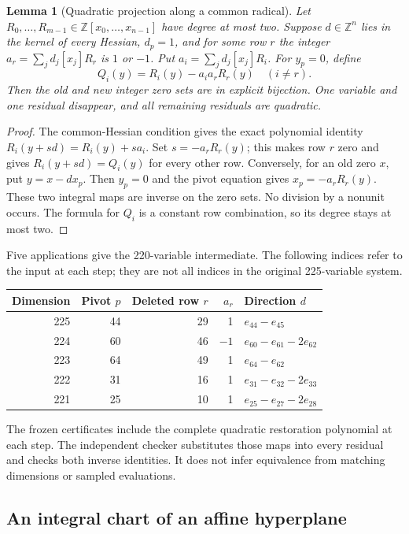 \documentclass[11pt,letterpaper]{article}
\newtheorem{lemma}[theorem]{Lemma}
\theoremstyle{definition}\newtheorem{definition}[theorem]{Definition}
\theoremstyle{remark}\newtheorem{remark}[theorem]{Remark}
\newcommand{\Z}{\mathbb Z}\newcommand{\N}{\mathbb N}
\begin{document}
\begin{lemma}[Quadratic projection along a common radical]\label{lem:radical}
Let $R_0,\ldots,R_{m-1}\in\Z[x_0,\ldots,x_{n-1}]$ have degree at most
two. Suppose $d\in\Z^n$ lies in the kernel of every Hessian, $d_p=1$,
and for some row $r$ the integer
$a_r=\sum_jd_j[x_j]R_r$ is $1$ or $-1$. Put $a_i=\sum_jd_j[x_j]R_i$.
For $y_p=0$, define
\[
 Q_i(y)=R_i(y)-a_i a_rR_r(y)\quad(i\ne r).
\]
Then the old and new integer zero sets are in explicit bijection. One
variable and one residual disappear, and all remaining residuals are
quadratic.
\end{lemma}
\begin{proof}
The common-Hessian condition gives the exact polynomial identity
$R_i(y+sd)=R_i(y)+sa_i$. Set $s=-a_rR_r(y)$; this makes row $r$ zero
and gives $R_i(y+sd)=Q_i(y)$ for every other row. Conversely, for an old
zero $x$, put $y=x-dx_p$. Then $y_p=0$ and the pivot equation gives
$x_p=-a_rR_r(y)$. These two integral maps are inverse on the zero sets.
No division by a nonunit occurs. The formula for $Q_i$ is a constant row
combination, so its degree stays at most two.
\end{proof}

Five applications give the 220-variable intermediate. The following
indices refer to the input at each step; they are not all indices in the
original 225-variable system.
\begin{center}\small
\begin{tabular}{rrrrl}
\toprule
Dimension & Pivot $p$ & Deleted row $r$ & $a_r$ & Direction $d$\\
\midrule
225&44&29&1&$e_{44}-e_{45}$\\
224&60&46&$-1$&$e_{60}-e_{61}-2e_{62}$\\
223&64&49&1&$e_{64}-e_{62}$\\
222&31&16&1&$e_{31}-e_{32}-2e_{33}$\\
221&25&10&1&$e_{25}-e_{27}-2e_{28}$\\
\bottomrule
\end{tabular}
\end{center}
The frozen certificates include the complete quadratic restoration
polynomial at each step. The independent checker substitutes those maps
into every residual and checks both inverse identities. It does not
infer equivalence from matching dimensions or sampled evaluations.

\subsection{An integral chart of an affine hyperplane}
\end{document}
